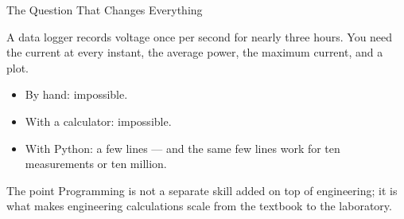 \documentclass[9pt,aspectratio=169,xcolor=table]{beamer}
\begin{document}
\begin{frame}[fragile]{The Question That Changes Everything}
    \leavevmode
    \begin{center}
    \end{center}

    \vspace{4mm}
    A data logger records voltage once per second for nearly three hours.
    You need the current at every instant, the average power, the maximum
    current, and a plot.

    \vspace{2mm}
    \begin{itemize}
        \item By hand: impossible.
        \item With a calculator: impossible.
        \item With Python: a few lines --- and the \alert{same} few lines
              work for ten measurements or ten million.
    \end{itemize}

    \vspace{3mm}
    \begin{block}{The point}
        Programming is not a separate skill added on top of engineering;
        it is what makes engineering calculations \alert{scale} from the
        textbook to the laboratory.
    \end{block}
\end{frame}
\end{document}
